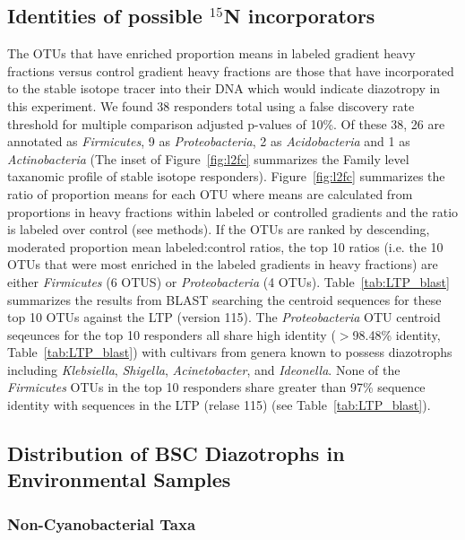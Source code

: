 \subsection{Identities of possible $^{15}$N incorporators}
The OTUs that have enriched proportion means in labeled gradient heavy fractions 
versus control gradient heavy fractions are those that have incorporated to the
stable isotope tracer into their DNA which would indicate diazotropy in this
experiment. We found 38 responders total using a false discovery rate threshold
for multiple comparison
adjusted p-values of 10\%. Of these 38, 26 are annotated as
\textit{Firmicutes}, 9 as \textit{Proteobacteria}, 2 as \textit{Acidobacteria}
and 1 as \textit{Actinobacteria} (The inset of Figure~\ref{fig:l2fc} summarizes
the Family level taxanomic profile of stable isotope responders).
Figure~\ref{fig:l2fc} summarizes the ratio of proportion means for each OTU
where means are calculated from proportions in heavy fractions within labeled
or controlled gradients and the ratio is labeled over control (see methods). If
the OTUs are ranked by descending, moderated proportion mean labeled:control
ratios, the top 10 ratios (i.e. the 10 OTUs that were most enriched in the
labeled gradients in heavy fractions) are either \textit{Firmicutes} (6 OTUS)
or \textit{Proteobacteria} (4 OTUs). Table~\ref{tab:LTP_blast} summarizes the results from BLAST
searching the centroid sequences for these top 10 OTUs against the LTP (version
115). The \textit{Proteobacteria} OTU centroid seqeunces for the top 10
responders all share high identity ($>$98.48\% identity, Table~\ref{tab:LTP_blast}) with
cultivars from genera known to possess diazotrophs including
\textit{Klebsiella}, \textit{Shigella}, \textit{Acinetobacter}, and
\textit{Ideonella}. None of the \textit{Firmicutes} OTUs in the top 10
responders share greater than 97\% sequence identity with sequences in the LTP
(relase 115) (see Table~\ref{tab:LTP_blast}).

\subsection{Distribution of BSC Diazotrophs in Environmental Samples}
\subsubsection{Non-Cyanobacterial Taxa}
